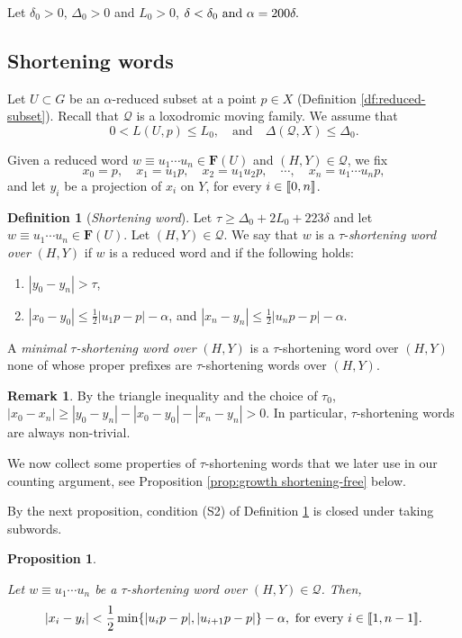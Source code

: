\documentclass[leqno,a4paper,10pt]{amsart}
\theoremstyle{plain}
\newtheorem{prop}[thm]{Proposition}
\theoremstyle{definition}
\newtheorem{df}[thm]{Definition}
\newtheorem{rem}[thm]{Remark}
\theoremstyle{remark}
\renewcommand{\geq}{\geqslant}
\newcommand{\F}{\mathbf{F}}
\newcommand{\scrQ}{\mathscr{Q}}
\let\le\leqslant
\let\ge\geqslant
\let\geq\geqslant
\newcommand{\zinterval}[2]{
	\mathchoice%
	{\left \llbracket #1, \cdots, #2 \right \rrbracket}%
	{\llbracket #1, #2 \rrbracket}%
	{\llbracket #1, #2 \rrbracket}%
	{\llbracket #1, #2 \rrbracket}%
}
\begin{document}
Let $\delta_0 >0$, $\Delta_0 >0$ and $L_0>0$, $\delta<\delta_0  \hbox{ and }  \alpha= 200\delta.$ 

\subsection{Shortening words}
\label{subsec:shortening-words}

Let $U\subset G$ be an $\alpha$-reduced subset at a point $p\in X$ (Definition \ref{df:reduced-subset}). Recall that $\scrQ$ is a loxodromic moving family. We assume that
$$0<L(U,p)\le L_0, \quad \text{and} \quad \Delta(\scrQ,X)\le \Delta_0.$$

Given a reduced word $w\equiv u_1\cdots u_n \in \F(U)$ and $(H,Y)\in \scrQ$, we fix 
$$x_0=p,\quad x_1=u_1p,\quad x_2=u_1u_2p,\quad \cdots,\quad x_n=u_1\cdots u_np,$$
and let $y_i$ be a projection of $x_i$ on $Y$, for every $i\in\zinterval{0}{n}$.


\begin{df}[\emph{Shortening word}]
	\label{df:shortening} Let $\tau\geq \Delta_0+2L_0+223\delta$ and let $w\equiv u_1\cdots u_n \in \F(U)$. Let $(H,Y)\in \scrQ$. We say that $w$ is a $\tau$-\emph{shortening word over} $(H,Y)$ if $w$ is a reduced word and if the following holds: 
	\begin{enumerate}[label=(S\arabic*)]
		\item $|y_0-y_n|>\tau$,
		\item $|x_0-y_0|\leqslant\frac{1}{2}|u_1p-p|-\alpha$, and $|x_n-y_n|\leqslant\frac{1}{2}|u_np-p|-\alpha.$
	\end{enumerate}
	A \emph{minimal $\tau$-shortening word over} $(H,Y)$ is a $\tau$-shortening word over $(H,Y)$ none of whose proper prefixes are $\tau$-shortening words over $(H,Y)$. 
\end{df}

\begin{rem}
\label{rem:non-identity}
By the triangle inequality and the choice of $\tau_0$, $|x_0-x_n|\ge |y_0-y_n|-|x_0-y_0|-|x_n-y_n|>0.$  In particular, $\tau$-shortening words are always non-trivial.
\end{rem}

We now collect some properties of $\tau$-shortening words that we later use in our counting argument, see Proposition \ref{prop:growth shortening-free} below. 

By the next proposition, condition (S2) of Definition \ref{df:shortening} is closed under taking subwords. 

\begin{prop}

\label{prop:shortening-subword}	
	
Let $w\equiv u_1\cdots u_n$ be a $\tau$-shortening word over $(H,Y)\in\scrQ$. Then,
$$|x_i-y_i|<\frac{1}{2}\min\{|u_ip-p|,|u_{i+1}p-p|\}-\alpha, \hbox{ for every $i\in\zinterval{1}{n-1}.$}$$ 

\end{prop}
\end{document}

